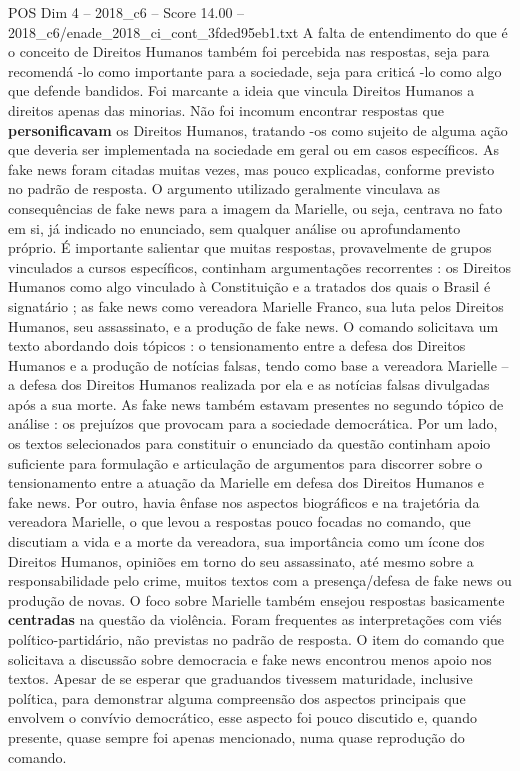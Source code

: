 \begin{textsample}{POS Dim 4 – 2018\_c6 – Score 14.00 – 2018\_c6/enade\_2018\_ci\_cont\_3fded95eb1.txt}
A falta de entendimento do que é o conceito de Direitos Humanos também foi percebida nas respostas, seja para recomendá -lo como importante para a sociedade, seja para criticá -lo como algo que defende bandidos.
Foi marcante a ideia que vincula Direitos Humanos a direitos apenas das minorias.
Não foi incomum encontrar respostas que \textbf{personificavam} os Direitos Humanos, tratando -os como sujeito de alguma ação que deveria ser implementada na sociedade em geral ou em casos específicos.
As fake news foram citadas muitas vezes, mas pouco explicadas, conforme previsto no padrão de resposta.
O argumento utilizado geralmente vinculava as consequências de fake news para a imagem da Marielle, ou seja, centrava no fato em si, já indicado no enunciado, sem qualquer análise ou aprofundamento próprio.
É importante salientar que muitas respostas, provavelmente de grupos vinculados a cursos específicos, continham argumentações recorrentes : os Direitos Humanos como algo vinculado à Constituição e a tratados dos quais o Brasil é signatário ; as fake news como vereadora Marielle Franco, sua luta pelos Direitos Humanos, seu assassinato, e a produção de fake news.
O comando solicitava um texto abordando dois tópicos : o tensionamento entre a defesa dos Direitos Humanos e a produção de notícias falsas, tendo como base a vereadora Marielle – a defesa dos Direitos Humanos realizada por ela e as notícias falsas divulgadas após a sua morte.
As fake news também estavam presentes no segundo tópico de análise : os prejuízos que provocam para a sociedade democrática.
Por um lado, os textos selecionados para constituir o enunciado da questão continham apoio suficiente para formulação e articulação de argumentos para discorrer sobre o tensionamento entre a atuação da Marielle em defesa dos Direitos Humanos e fake news.
Por outro, havia ênfase nos aspectos biográficos e na trajetória da vereadora Marielle, o que levou a respostas pouco focadas no comando, que discutiam a vida e a morte da vereadora, sua importância como um ícone dos Direitos Humanos, opiniões em torno do seu assassinato, até mesmo sobre a responsabilidade pelo crime, muitos textos com a presença/defesa de fake news ou produção de novas.
O foco sobre Marielle também ensejou respostas basicamente \textbf{centradas} na questão da violência.
Foram frequentes as interpretações com viés político-partidário, não previstas no padrão de resposta.
O item do comando que solicitava a discussão sobre democracia e fake news encontrou menos apoio nos textos.
Apesar de se esperar que graduandos tivessem maturidade, inclusive política, para demonstrar alguma compreensão dos aspectos principais que envolvem o convívio democrático, esse aspecto foi pouco discutido e, quando presente, quase sempre foi apenas mencionado, numa quase reprodução do comando.

\end{textsample}
